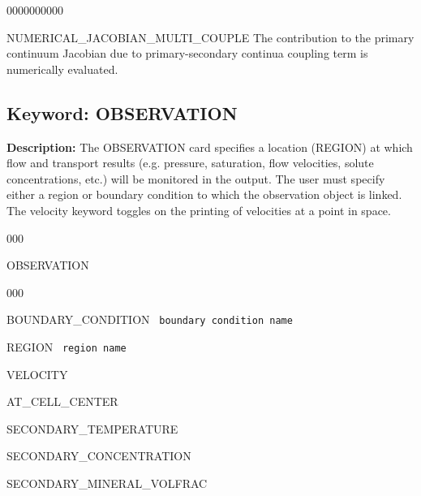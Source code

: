 \hfill\hyperlink{target_key}{\return}

\begin{deflist}{0000000000}
\item[NUMERICAL\_JACOBIAN\_MULTI\_COUPLE]
The contribution to the primary continuum Jacobian due to primary-secondary continua coupling term is numerically evaluated.
\end{deflist}

\hyperlink{target_key}{\return}


\newpage
\protect\hypertarget{target_observation}{}

\subsection{Keyword: OBSERVATION}

\hfill\hyperlink{target_key}{\return}

{\noindent\bf Description:}
The OBSERVATION card specifies a location (REGION) at which flow and transport results (e.g. pressure, saturation, flow velocities, solute concentrations, etc.) will be monitored in the output.
The user must specify either a region or boundary condition to which the observation object is linked.  The velocity keyword toggles on the printing of velocities at a point in space.

\begin{deflist}{000}
\item[OBSERVATION] ~
\begin{deflist}{000}
\item[BOUNDARY\_CONDITION] \ {\tt boundary condition name}
\item[REGION] \ {\tt region name}
\item[VELOCITY]
\item[AT\_CELL\_CENTER]
\item[SECONDARY\_TEMPERATURE]
\item[SECONDARY\_CONCENTRATION]
\item[SECONDARY\_MINERAL\_VOLFRAC]
\end{deflist}
\item[\keyend]
\end{deflist}

